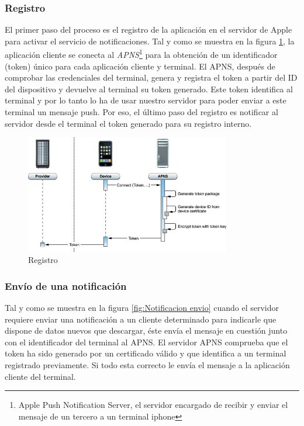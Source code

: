    \subsubsection{Registro}

     El primer paso del proceso es el registro de la aplicación en el servidor de Apple para activar el servicio de notificaciones. Tal y como se muestra en la figura \ref{fig:Notificacion Registro}, la aplicación cliente se conecta al \emph{APNS}\footnote{Apple Push Notification Server, el servidor encargado de recibir y enviar el mensaje de un tercero a un terminal iphone} para la obtención de un identificador (token) único para cada aplicación cliente y terminal. El APNS, después de comprobar las credenciales del terminal, genera y registra el token a partir del ID del dispositivo y devuelve al terminal su token generado. Este token identifica al terminal y por lo tanto lo ha de usar nuestro servidor para poder enviar a este terminal un mensaje push. Por eso, el último paso del registro es notificar al servidor desde el terminal el token generado para su registro interno.
     
 \begin{figure}[h!]
    \centering
       \includegraphics[width=0.8\textwidth]{./images/token_generation.jpg}
     \caption{Registro }
   \label{fig:Notificacion Registro}
\end{figure}
  
     \subsubsection{Envío de una notificación}
     
     Tal y como se muestra en la figura \ref{fig:Notificacion envio} cuando el servidor requiere enviar una notificación a un cliente determinado para indicarle que dispone de datos nuevos que descargar, éste envía el mensaje en cuestión junto con el identificador del terminal al APNS. El servidor APNS comprueba que el token ha sido generado por un certificado válido y que identifica a un terminal registrado previamente. Si todo esta correcto le envía el mensaje a la aplicación cliente del terminal.
     
